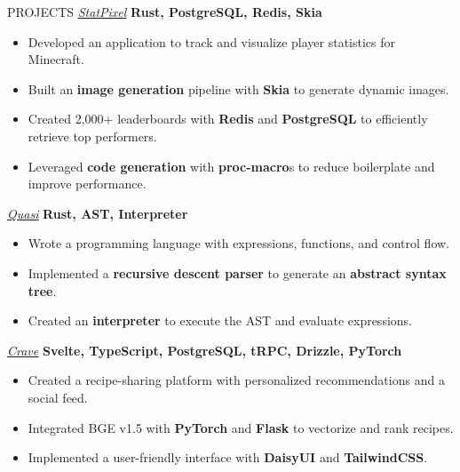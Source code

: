\documentclass{resume}
\begin{document}
\begin{rSection}{PROJECTS}
	\href{https://github.com/statpixel-rs/statpixel}{\underline{\textit{StatPixel}}} \textbf{Rust, PostgreSQL, Redis, Skia}
	\vspace{-8pt}
	\begin{itemize}
		\itemsep -6pt {}
		\item Developed an application to track and visualize player statistics for Minecraft.
		\item Built an \textbf{image generation} pipeline with \textbf{Skia} to generate dynamic images.
		\item Created 2,000+ leaderboards with \textbf{Redis} and \textbf{PostgreSQL} to efficiently retrieve top performers.
		\item Leveraged \textbf{code generation} with \textbf{proc-macro}s to reduce boilerplate and improve performance.
	\end{itemize}

	\vspace{-4pt}

	\href{https://github.com/matteopolak/quasi}{\underline{\textit{Quasi}}} \textbf{Rust, AST, Interpreter}
	\vspace{-8pt}
	\begin{itemize}
		\itemsep -6pt {}
		\item Wrote a programming language with expressions, functions, and control flow.
		\item Implemented a \textbf{recursive descent parser} to generate an \textbf{abstract syntax tree}.
		\item Created an \textbf{interpreter} to execute the AST and evaluate expressions.
	\end{itemize}

	\vspace{-4pt}

	\href{https://github.com/matteopolak/crave}{\underline{\textit{Crave}}} \textbf{Svelte, TypeScript, PostgreSQL, tRPC, Drizzle, PyTorch}
	\vspace{-8pt}
	\begin{itemize}
		\itemsep -6pt {}
		\item Created a recipe-sharing platform with personalized recommendations and a social feed.
		\item Integrated BGE v1.5 with \textbf{PyTorch} and \textbf{Flask} to vectorize and rank recipes.
		\item Implemented a user-friendly interface with \textbf{DaisyUI} and \textbf{TailwindCSS}.
	\end{itemize}
\end{rSection}
\end{document}
